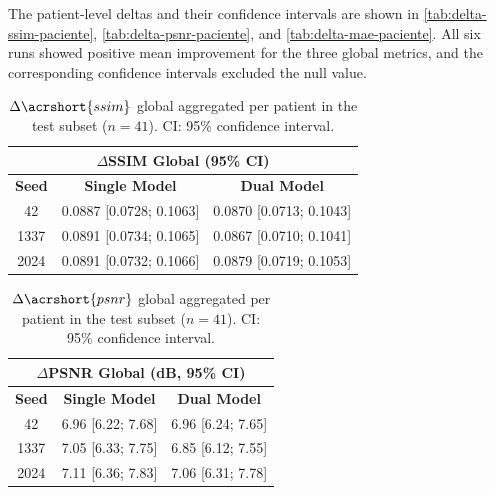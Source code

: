 The patient-level deltas and their confidence intervals are shown in \autoref{tab:delta-ssim-paciente}, \autoref{tab:delta-psnr-paciente}, and \autoref{tab:delta-mae-paciente}. All six runs showed positive mean improvement for the three global metrics, and the corresponding confidence intervals excluded the null value.
\begin{table}[htbp]
    \centering
    \begin{tabular}{ccc}
        \multicolumn{3}{c}{\textbf{$\Delta$SSIM Global (95\% CI)}} \\[4pt]
        \hline
        \textbf{Seed} & \textbf{Single Model} & \textbf{Dual Model} \\
        \hline
        42   & 0.0887 [0.0728; 0.1063] & 0.0870 [0.0713; 0.1043] \\
        1337 & 0.0891 [0.0734; 0.1065] & 0.0867 [0.0710; 0.1041] \\
        2024 & 0.0891 [0.0732; 0.1066] & 0.0879 [0.0719; 0.1053] \\
        \hline
    \end{tabular}
    \captionsetup{skip=2pt}
    \caption[Patient-level global $\Delta$SSIM]{$\Delta\acrshort{ssim}$ global aggregated per patient in the test subset ($n=41$). CI: 95\% confidence interval.}
    \label{tab:delta-ssim-paciente}
\end{table}

\begin{table}[htbp]
    \centering
    \begin{tabular}{ccc}
        \multicolumn{3}{c}{\textbf{$\Delta$PSNR Global (dB, 95\% CI)}} \\[4pt]
        \hline
        \textbf{Seed} & \textbf{Single Model} & \textbf{Dual Model} \\
        \hline
        42   & 6.96 [6.22; 7.68] & 6.96 [6.24; 7.65] \\
        1337 & 7.05 [6.33; 7.75] & 6.85 [6.12; 7.55] \\
        2024 & 7.11 [6.36; 7.83] & 7.06 [6.31; 7.78] \\
        \hline
    \end{tabular}
    \captionsetup{skip=2pt}
    \caption[Patient-level global $\Delta$PSNR]{$\Delta\acrshort{psnr}$ global aggregated per patient in the test subset ($n=41$). CI: 95\% confidence interval.}
    \label{tab:delta-psnr-paciente}
\end{table}

